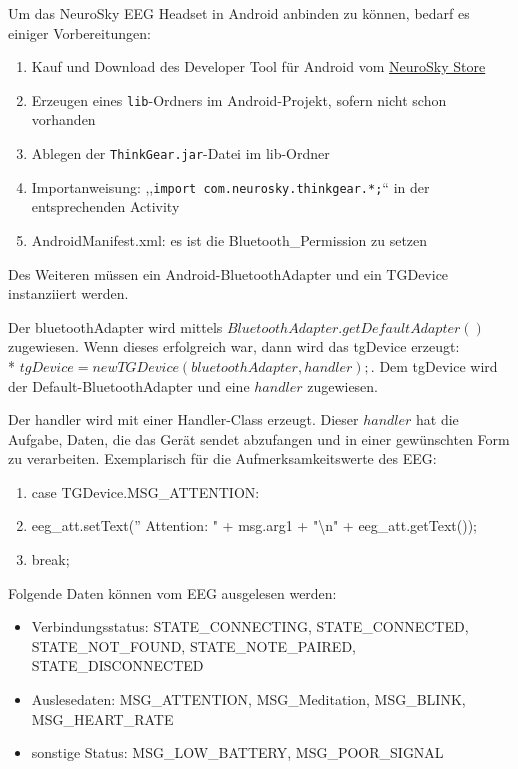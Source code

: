 	Um das NeuroSky EEG Headset in Android anbinden zu können, bedarf es einiger Vorbereitungen:
	\begin{enumerate}
	\item Kauf und Download des Developer Tool für Android vom \href{http://store.neurosky.com/products/developer-tools-3-android} {NeuroSky Store}
	\item Erzeugen eines \texttt{lib}-Ordners im Android-Projekt, sofern nicht schon vorhanden
	\item Ablegen der \texttt{ThinkGear.jar}-Datei im lib-Ordner
	\item Importanweisung: ,,\texttt{import com.neurosky.thinkgear.*;}`` in der entsprechenden Activity
	\item AndroidManifest.xml: es ist die Bluetooth\_Permission zu setzen
	\end{enumerate}
	
	Des Weiteren müssen ein Android-BluetoothAdapter und ein TGDevice instanziiert werden.

	Der bluetoothAdapter wird mittels $BluetoothAdapter.getDefaultAdapter()$ zugewiesen. Wenn dieses erfolgreich war, dann wird das tgDevice erzeugt: \\* $tgDevice = new TGDevice(bluetoothAdapter, handler);$. Dem tgDevice wird der Default-BluetoothAdapter und eine $handler$ zugewiesen. 
	
	Der handler \label{handler} wird mit einer Handler-Class erzeugt. Dieser $handler$ hat die Aufgabe, Daten, die das Gerät sendet abzufangen und in einer gewünschten Form zu verarbeiten. Exemplarisch für die Aufmerksamkeitswerte des EEG:
	
	\begin{enumerate}
	\item case TGDevice.MSG\_ATTENTION:
    \item eeg\_att.setText('' Attention: " + msg.arg1 + "\textbackslash n" + eeg\_att.getText());
	\item break;
	\end{enumerate}
	
	Folgende Daten können vom EEG ausgelesen werden:
	
	\begin{itemize}
	\item Verbindungsstatus: STATE\_CONNECTING, STATE\_CONNECTED, \\STATE\_NOT\_FOUND, STATE\_NOTE\_PAIRED, STATE\_DISCONNECTED
	\item Auslesedaten: MSG\_ATTENTION, MSG\_Meditation, MSG\_BLINK, \\MSG\_HEART\_RATE
	\item sonstige Status: MSG\_LOW\_BATTERY, MSG\_POOR\_SIGNAL
	\end{itemize}
	
